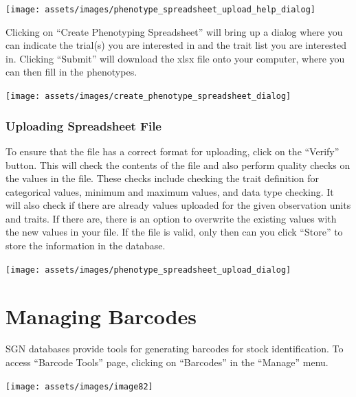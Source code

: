 \documentclass[
  12pt,
]{book}
\begin{document}
\begin{center}\texttt{[image: assets/images/phenotype\_spreadsheet\_upload\_help\_dialog]} \end{center}

Clicking on ``Create Phenotyping Spreadsheet'' will bring up a dialog where you can indicate the trial(s) you are interested in and the trait list you are interested in. Clicking ``Submit'' will download the xlsx file onto your computer, where you can then fill in the phenotypes.

\begin{center}\texttt{[image: assets/images/create\_phenotype\_spreadsheet\_dialog]} \end{center}

\hypertarget{uploading-spreadsheet-file}{%
\subsection{Uploading Spreadsheet File}\label{uploading-spreadsheet-file}}

To ensure that the file has a correct format for uploading, click on the ``Verify'' button. This will check the contents of the file and also perform quality checks on the values in the file. These checks include checking the trait definition for categorical values, minimum and maximum values, and data type checking. It will also check if there are already values uploaded for the given observation units and traits. If there are, there is an option to overwrite the existing values with the new values in your file. If the file is valid, only then can you click ``Store'' to store the information in the database.

\begin{center}\texttt{[image: assets/images/phenotype\_spreadsheet\_upload\_dialog]} \end{center}

\hypertarget{managing-barcodes}{%
\chapter{Managing Barcodes}\label{managing-barcodes}}

SGN databases provide tools for generating barcodes for stock identification. To access ``Barcode Tools'' page, clicking on ``Barcodes'' in the ``Manage'' menu.

\begin{center}\texttt{[image: assets/images/image82]} \end{center}
\end{document}
